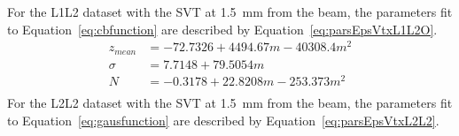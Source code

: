 For the L1L2 dataset with the SVT at 1.5~mm from the beam, the parameters fit to Equation~\eqref{eq:cbfunction} are described by Equation~\eqref{eq:parsEpsVtxL1L2O}.
\begin{equation}
\begin{split}
\label{eq:parsEpsVtxL1L2O}
z_{mean} &= -72.7326+4494.67m-40308.4m^2\\
\sigma &= 7.7148+79.5054m\\
N &= -0.3178+22.8208m-253.373m^2 \\
\end{split}
\end{equation}
For the L2L2 dataset with the SVT at 1.5~mm from the beam, the parameters fit to Equation~\eqref{eq:gausfunction} are described by Equation~\eqref{eq:parsEpsVtxL2L2}.